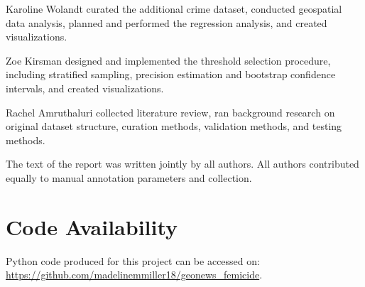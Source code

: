 \documentclass{article}
\begin{document}
Karoline Wolandt curated the additional crime dataset, conducted geospatial data analysis, planned and performed the regression analysis, and created visualizations.

Zoe Kirsman designed and implemented the threshold selection procedure, including stratified sampling, precision estimation and bootstrap confidence intervals, and created visualizations.

Rachel Amruthaluri collected literature review, ran background research on original dataset structure, curation methods, validation methods, and testing methods.

The text of the report was written jointly by all
authors.
All authors contributed equally to manual annotation parameters and collection.

\section*{Code Availability}
Python code produced for this project can be accessed on: 
\url{https://github.com/madelinemmiller18/geonews_femicide}.



\end{document}
